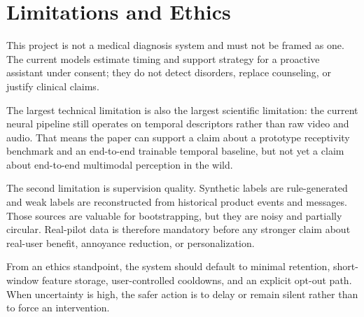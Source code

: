 \section{Limitations and Ethics}
This project is not a medical diagnosis system and must not be framed as one. The current models estimate timing and support strategy for a proactive assistant under consent; they do not detect disorders, replace counseling, or justify clinical claims.

The largest technical limitation is also the largest scientific limitation: the current neural pipeline still operates on temporal descriptors rather than raw video and audio. That means the paper can support a claim about a prototype receptivity benchmark and an end-to-end trainable temporal baseline, but not yet a claim about end-to-end multimodal perception in the wild.

The second limitation is supervision quality. Synthetic labels are rule-generated and weak labels are reconstructed from historical product events and messages. Those sources are valuable for bootstrapping, but they are noisy and partially circular. Real-pilot data is therefore mandatory before any stronger claim about real-user benefit, annoyance reduction, or personalization.

From an ethics standpoint, the system should default to minimal retention, short-window feature storage, user-controlled cooldowns, and an explicit opt-out path. When uncertainty is high, the safer action is to delay or remain silent rather than to force an intervention.
